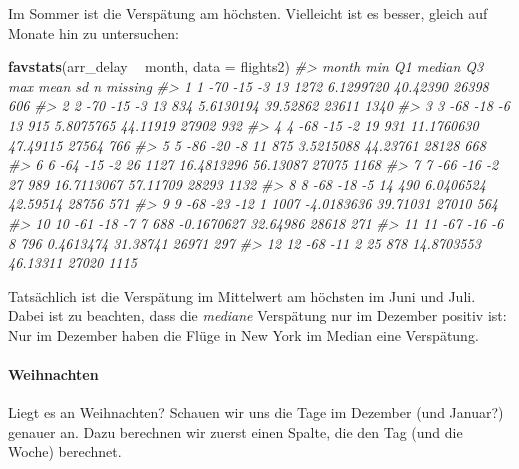 \documentclass[]{article}
\newenvironment{Shaded}{\begin{snugshade}}{\end{snugshade}}
\newcommand{\CommentTok}[1]{\textcolor[rgb]{0.56,0.35,0.01}{\textit{#1}}}
\newcommand{\DataTypeTok}[1]{\textcolor[rgb]{0.13,0.29,0.53}{#1}}
\newcommand{\DecValTok}[1]{\textcolor[rgb]{0.00,0.00,0.81}{#1}}
\newcommand{\KeywordTok}[1]{\textcolor[rgb]{0.13,0.29,0.53}{\textbf{#1}}}
\newcommand{\NormalTok}[1]{#1}
\newcommand{\OperatorTok}[1]{\textcolor[rgb]{0.81,0.36,0.00}{\textbf{#1}}}
\newcommand{\StringTok}[1]{\textcolor[rgb]{0.31,0.60,0.02}{#1}}
\let\oldparagraph\paragraph
\renewcommand{\paragraph}[1]{\oldparagraph{#1}\mbox{}}
\begin{document}
Im Sommer ist die Verspätung am höchsten. Vielleicht ist es besser,
gleich auf Monate hin zu untersuchen:

\begin{Shaded}
\begin{Highlighting}[]
\KeywordTok{favstats}\NormalTok{(arr_delay }\OperatorTok{~}\StringTok{ }\NormalTok{month, }\DataTypeTok{data =}\NormalTok{ flights2)}
\CommentTok{#>    month min  Q1 median Q3  max       mean       sd     n missing}
\CommentTok{#> 1      1 -70 -15     -3 13 1272  6.1299720 40.42390 26398     606}
\CommentTok{#> 2      2 -70 -15     -3 13  834  5.6130194 39.52862 23611    1340}
\CommentTok{#> 3      3 -68 -18     -6 13  915  5.8075765 44.11919 27902     932}
\CommentTok{#> 4      4 -68 -15     -2 19  931 11.1760630 47.49115 27564     766}
\CommentTok{#> 5      5 -86 -20     -8 11  875  3.5215088 44.23761 28128     668}
\CommentTok{#> 6      6 -64 -15     -2 26 1127 16.4813296 56.13087 27075    1168}
\CommentTok{#> 7      7 -66 -16     -2 27  989 16.7113067 57.11709 28293    1132}
\CommentTok{#> 8      8 -68 -18     -5 14  490  6.0406524 42.59514 28756     571}
\CommentTok{#> 9      9 -68 -23    -12  1 1007 -4.0183636 39.71031 27010     564}
\CommentTok{#> 10    10 -61 -18     -7  7  688 -0.1670627 32.64986 28618     271}
\CommentTok{#> 11    11 -67 -16     -6  8  796  0.4613474 31.38741 26971     297}
\CommentTok{#> 12    12 -68 -11      2 25  878 14.8703553 46.13311 27020    1115}
\end{Highlighting}
\end{Shaded}

Tatsächlich ist die Verspätung im Mittelwert am höchsten im Juni und
Juli. Dabei ist zu beachten, dass die \emph{mediane} Verspätung nur im
Dezember positiv ist: Nur im Dezember haben die Flüge in New York im
Median eine Verspätung.

\hypertarget{weihnachten}{%
\paragraph{Weihnachten}\label{weihnachten}}

Liegt es an Weihnachten? Schauen wir uns die Tage im Dezember (und
Januar?) genauer an. Dazu berechnen wir zuerst einen Spalte, die den Tag
(und die Woche) berechnet.

\begin{Shaded}
\end{Shaded}
\end{document}
